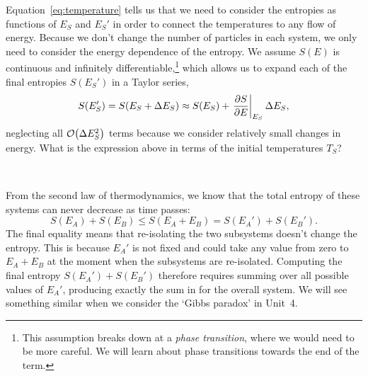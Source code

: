 Equation~\ref{eq:temperature} tells us that we need to consider the entropies as functions of $E_S$ and $E_S'$ in order to connect the temperatures to any flow of energy.
Because we don't change the number of particles in each system, we only need to consider the energy dependence of the entropy.
We assume $S(E)$ is continuous and infinitely differentiable,\footnote{This assumption breaks down at a \textit{phase transition}, where we would need to be more careful.  We will learn about phase transitions towards the end of the term.} which allows us to expand each of the final entropies $S(E_S')$ in a Taylor series,
\begin{equation*}
  S(E_S') = S(E_S + \Delta E_S) \approx S(E_S) + \left.\frac{\partial S}{\partial E}\right|_{E_S} \Delta E_S,
\end{equation*}
neglecting all $\mathcal O\!\left(\Delta E_S^2\right)$ terms because we consider relatively small changes in energy.
What is the expression above in terms of the initial temperatures $T_S$?
\begin{mdframed}
  \ \\[50 pt]
\end{mdframed}

From the second law of thermodynamics, we know that the total entropy of these systems can never decrease as time passes:
\begin{equation}
  \label{eq:entropy_ineq}
  S(E_A) + S(E_B) \leq S(E_A + E_B) = S(E_A') + S(E_B').
\end{equation}
The final equality means that re-isolating the two subsystems doesn't change the entropy.
This is because $E_A'$ is not fixed and could take any value from zero to $E_A + E_B$ at the moment when the subsystems are re-isolated.
Computing the final entropy $S(E_A') + S(E_B')$ therefore requires summing over all possible values of $E_A'$, producing exactly the sum in  for the overall system.
We will see something similar when we consider the `Gibbs paradox' in Unit~4.

